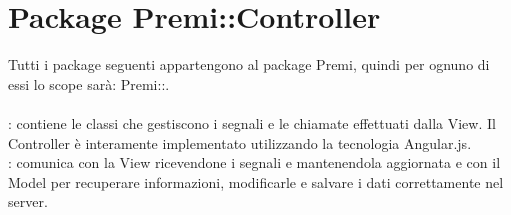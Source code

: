 \section{Package Premi::\-Controller}{
	\label{sec:controller}
	Tutti i package seguenti appartengono al package Premi, quindi per ognuno di essi lo scope sarà: Premi::.\\\\
	\textbf{\tipo}: contiene le classi che gestiscono i segnali e le chiamate effettuati dalla View. Il Controller è interamente implementato utilizzando la tecnologia Angular.js.\\
	\textbf{\relaz}: comunica con la View ricevendone i segnali e mantenendola aggiornata e con il Model per recuperare informazioni, modificarle e salvare i dati correttamente nel server.\\

}
